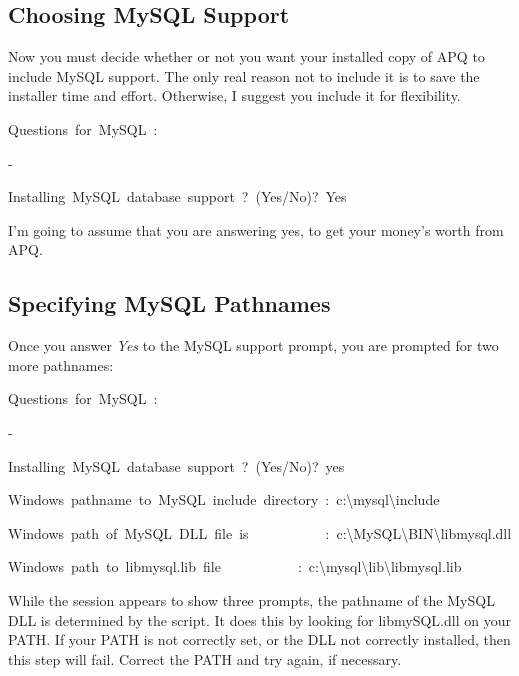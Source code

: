 \documentclass[english]{report}
\newenvironment{lyxcode}
   {\begin{list}{}{
     \setlength{\rightmargin}{\leftmargin}
     \setlength{\listparindent}{0pt}%
     \raggedright
     \setlength{\itemsep}{0pt}
     \setlength{\parsep}{0pt}
     \normalfont\ttfamily}%
    \item[]}
   {\end{list}}
\begin{document}
\subsection{Choosing MySQL Support}

Now you must decide whether or not you want your installed copy of
APQ to include MySQL support. The only real reason not to include
it is to save the installer time and effort. Otherwise, I suggest
you include it for flexibility.

\begin{lyxcode}
Questions~for~MySQL~:

-

Installing~MySQL~database~support~?~(Yes/No)?~Yes
\end{lyxcode}
I'm going to assume that you are answering yes, to get your money's
worth from APQ.


\subsection{Specifying MySQL Pathnames}

Once you answer \emph{Yes} to the MySQL support prompt, you are prompted
for two more pathnames:

\begin{lyxcode}
{\footnotesize Questions~for~MySQL~:}{\footnotesize \par}

-

{\footnotesize Installing~MySQL~database~support~?~(Yes/No)?~yes}{\footnotesize \par}

{\footnotesize Windows~pathname~to~MySQL~include~directory~:~c:\textbackslash{}mysql\textbackslash{}include}{\footnotesize \par}

{\footnotesize Windows~path~of~MySQL~DLL~file~is~~~~~~~~~~~:~c:\textbackslash{}MySQL\textbackslash{}BIN\textbackslash{}libmysql.dll}{\footnotesize \par}

{\footnotesize Windows~path~to~libmysql.lib~file~~~~~~~~~~~:~c:\textbackslash{}mysql\textbackslash{}lib\textbackslash{}libmysql.lib}{\footnotesize \par}
\end{lyxcode}
While the session appears to show three prompts, the pathname of the
MySQL DLL is determined by the script. It does this by looking for
libmySQL.dll on your PATH. If your PATH is not correctly set, or the
DLL not correctly installed, then this step will fail. Correct the
PATH and try again, if necessary.
\end{document}
